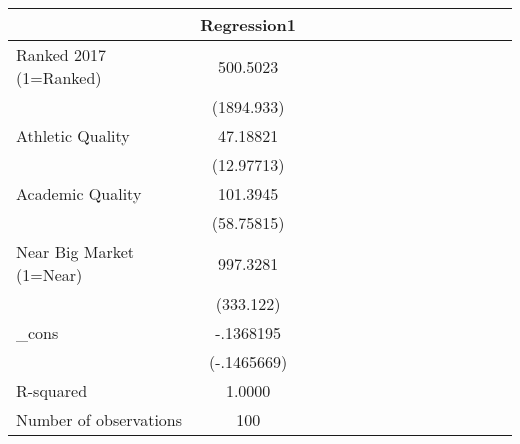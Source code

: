 \begin{tabular}{l*{14}{c}}
            & Regression1         \\
\hline
Ranked 2017 (1=Ranked)  &    500.5023\sym{***}\\
            &  (1894.933)         \\
Athletic Quality&    47.18821\sym{***}\\
            &  (12.97713)         \\
Academic Quality&    101.3945\sym{***}\\
            &  (58.75815)         \\
Near Big Market (1=Near)&    997.3281\sym{***}\\
            &   (333.122)         \\
\_cons      &   -.1368195         \\
            & (-.1465669)         \\
\hline
R-squared   &      1.0000         \\
Number of observations&         100         \\
\end{tabular}
